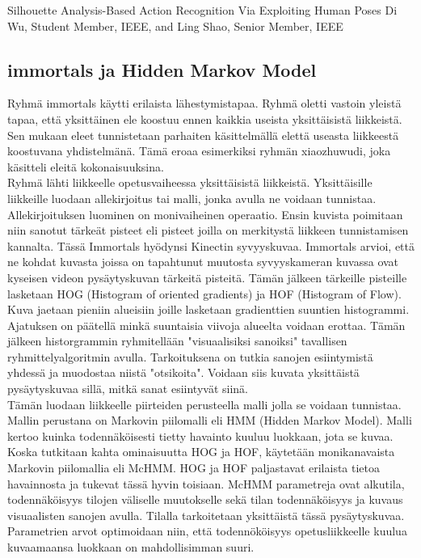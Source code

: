 Silhouette Analysis-Based Action Recognition Via
Exploiting Human Poses
Di Wu, Student Member, IEEE, and Ling Shao, Senior Member, IEEE


\subsection{immortals ja Hidden Markov Model}

Ryhmä immortals käytti erilaista lähestymistapaa. Ryhmä oletti vastoin yleistä tapaa,
että yksittäinen ele koostuu ennen kaikkia useista yksittäisistä liikkeistä. Sen mukaan eleet tunnistetaan parhaiten
käsittelmällä elettä useasta liikkeestä koostuvana yhdistelmänä. Tämä eroaa esimerkiksi ryhmän xiaozhuwudi, joka käsitteli
eleitä kokonaisuuksina.\\
Ryhmä lähti liikkeelle opetusvaiheessa yksittäisistä liikkeistä. Yksittäisille liikkeille luodaan allekirjoitus tai malli,
jonka avulla ne voidaan tunnistaa. Allekirjoituksen luominen on monivaiheinen operaatio. Ensin kuvista poimitaan niin sanotut
tärkeät pisteet eli pisteet joilla on merkitystä liikkeen tunnistamisen kannalta. Tässä Immortals hyödynsi Kinectin syvyyskuvaa.
Immortals arvioi, että ne kohdat kuvasta joissa on tapahtunut muutosta syvyyskameran kuvassa ovat kyseisen videon pysäytyskuvan
tärkeitä pisteitä. Tämän jälkeen tärkeille pisteille lasketaan HOG (Histogram of oriented gradients) ja HOF (Histogram of Flow). 
Kuva jaetaan pieniin alueisiin joille lasketaan gradienttien suuntien histogrammi. Ajatuksen on päätellä minkä suuntaisia 
viivoja alueelta voidaan erottaa. Tämän jälkeen historgrammin ryhmitellään "visuaalisiksi sanoiksi" tavallisen ryhmittelyalgoritmin avulla.
Tarkoituksena on tutkia sanojen esiintymistä yhdessä ja muodostaa niistä "otsikoita". Voidaan siis kuvata yksittäistä pysäytyskuvaa
sillä, mitkä sanat esiintyvät siinä.\\
Tämän luodaan liikkeelle piirteiden perusteella malli jolla se voidaan tunnistaa. Mallin perustana on Markovin piilomalli eli HMM (Hidden Markov Model).
Malli kertoo kuinka todennäköisesti tietty havainto kuuluu luokkaan, jota se kuvaa. Koska tutkitaan kahta ominaisuutta HOG ja HOF,
käytetään monikanavaista Markovin piilomallia eli McHMM. HOG ja HOF paljastavat erilaista tietoa havainnosta ja tukevat tässä hyvin toisiaan.
McHMM parametreja ovat alkutila, todennäköisyys tilojen väliselle muutokselle sekä tilan todennäköisyys ja kuvaus visuaalisten sanojen avulla. Tilalla tarkoitetaan
yksittäistä tässä pysäytyskuvaa. Parametrien arvot optimoidaan niin, että todennököisyys opetusliikkeelle kuulua kuvaamaansa luokkaan on mahdollisimman suuri.\\
